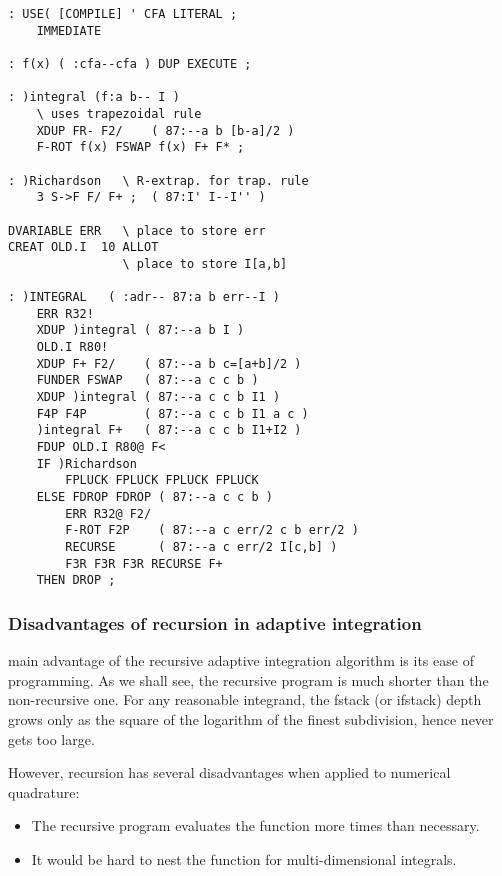 \begin{multicols}{2}
    \tiny
    \begin{lstlisting}
: USE( [COMPILE] ' CFA LITERAL ;
    IMMEDIATE

: f(x) ( :cfa--cfa ) DUP EXECUTE ;

: )integral (f:a b-- I )
    \ uses trapezoidal rule
    XDUP FR- F2/    ( 87:--a b [b-a]/2 )
    F-ROT f(x) FSWAP f(x) F+ F* ;

: )Richardson   \ R-extrap. for trap. rule
    3 S->F F/ F+ ;  ( 87:I' I--I'' )

DVARIABLE ERR   \ place to store err
CREAT OLD.I  10 ALLOT
                \ place to store I[a,b]

: )INTEGRAL   ( :adr-- 87:a b err--I )
    ERR R32!
    XDUP )integral ( 87:--a b I )
    OLD.I R80!
    XDUP F+ F2/    ( 87:--a b c=[a+b]/2 )
    FUNDER FSWAP   ( 87:--a c c b )
    XDUP )integral ( 87:--a c c b I1 )
    F4P F4P        ( 87:--a c c b I1 a c )
    )integral F+   ( 87:--a c c b I1+I2 )
    FDUP OLD.I R80@ F<
    IF )Richardson
        FPLUCK FPLUCK FPLUCK FPLUCK
    ELSE FDROP FDROP ( 87:--a c c b )
        ERR R32@ F2/
        F-ROT F2P    ( 87:--a c err/2 c b err/2 )
        RECURSE      ( 87:--a c err/2 I[c,b] )
        F3R F3R F3R RECURSE F+
    THEN DROP ;
    \end{lstlisting}
\end{multicols}

\subsubsection{Disadvantages of recursion in adaptive integration}
 main advantage of the recursive adaptive integration algorithm is its ease of programming. As we shall see, the recursive program is much shorter than the non-recursive one. For any reasonable integrand, the fstack (or ifstack) depth grows only as the square of the logarithm of the finest subdivision, hence never gets too large.

However, recursion has several disadvantages when applied to numerical quadrature:

\begin{itemize}
    \item The recursive program evaluates the function more times than necessary.
    \item It would be hard to nest the function  for multi-dimensional integrals.
\end{itemize}

